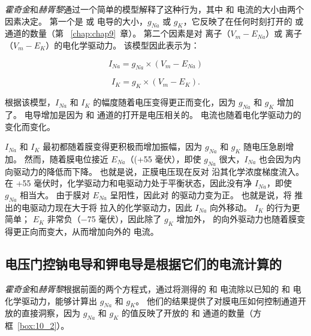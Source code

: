 \textit{霍奇金}和\textit{赫胥黎}通过一个简单的模型解释了这种行为，其中  和  电流的大小由两个因素决定。
第一个是  或  电导的大小，$g_{Na}$ 或 $g_K$，它反映了在任何时刻打开的  或  通道的数量（第 ~\ref{chap:chap9}~章）。
第二个因素是对  离子（$V_m − E_{Na}$）或  离子（$V_m − E_K$）的电化学驱动力。
该模型因此表示为：

\begin{equation}
	I_{Na} = g_{Na} \times (V_m - E_{Na})
\end{equation}

\begin{equation}
	I_K = g_K \times (V_m - E_K).
\end{equation}


根据该模型，$I_{Na}$ 和 $I_K$ 的幅度随着电压变得更正而变化，因为 $g_{Na}$ 和 $g_K$ 增加了。
电导增加是因为  和  通道的打开是电压相关的。
电流也随着电化学驱动力的变化而变化。


$I_{Na}$ 和 $I_K$ 最初都随着膜变得更积极而增加振幅，因为 $g_{Na}$ 和 $g_K$ 随电压急剧增加。
然而，随着膜电位接近 $E_{Na}$（(+55 毫伏），即使 $g_{Na}$ 很大，$I_{Na}$ 也会因为内向驱动力的降低而下降。
也就是说，正膜电压现在反对  沿其化学浓度梯度流入。
在 +55 毫伏时，化学驱动力和电驱动力处于平衡状态，因此没有净 $I_{Na}$，即使 $g_{Na}$ 相当大。
由于膜对 $E_{Na}$ 呈阳性，因此对  的驱动力变为正。 
也就是说，将  推出的电驱动力现在大于将  拉入的化学驱动力，因此 $I_{Na}$ 向外移动。
$I_K$ 的行为更简单；
$E_K$ 非常负（−75 毫伏），因此除了 $g_K$ 增加外， 的向外驱动力也随着膜变得更正向而变大，从而增加向外的  电流。



\subsection{电压门控钠电导和钾电导是根据它们的电流计算的}

\textit{霍奇金}和\textit{赫胥黎}根据前面的两个方程式，通过将测得的  和  电流除以已知的  和  电化学驱动力，能够计算出 $g_{Na}$ 和 $g_K$。
他们的结果提供了对膜电压如何控制通道开放的直接洞察，因为 $g_{Na}$ 和 $g_K$ 的值反映了开放的  和  通道的数量（方框~\ref{box:10_2}）。


